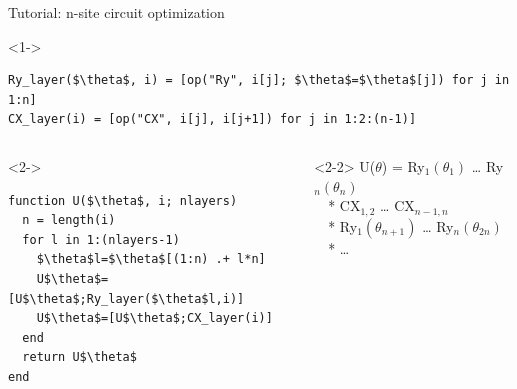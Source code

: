 \begin{frame}[fragile]{Tutorial: n-site circuit optimization}

\begin{onlyenv}<1->
\begin{lstlisting}[language=JuliaLocal, style=julia, mathescape, basicstyle=\scriptsize\ttfamily]
Ry_layer($\theta$, i) = [op("Ry", i[j]; $\theta$=$\theta$[j]) for j in 1:n]
CX_layer(i) = [op("CX", i[j], i[j+1]) for j in 1:2:(n-1)]
\end{lstlisting}
\end{onlyenv}

\begin{columns}

\begin{column}{5cm}

\begin{onlyenv}<2->
\begin{lstlisting}[language=JuliaLocal, style=julia, mathescape, basicstyle=\scriptsize\ttfamily]
function U($\theta$, i; nlayers)
  n = length(i)
  for l in 1:(nlayers-1)
    $\theta$l=$\theta$[(1:n) .+ l*n]
    U$\theta$=[U$\theta$;Ry_layer($\theta$l,i)]
    U$\theta$=[U$\theta$;CX_layer(i)]
  end
  return U$\theta$
end
\end{lstlisting}
\end{onlyenv}

\end{column}

\begin{column}{5.5cm}

\begin{onlyenv}<2-2>
U($\theta$) = Ry$_1(\theta_1)$ … Ry$_n(\theta_n)$ \\
\ \ *           CX$_{1,2}$ … CX$_{n-1,n}$ \\
\ \ *          Ry$_1(\theta_{n+1})$ … Ry$_n(\theta_{2n})$ \\
\ \ *           …
~\\
~\\
~\\
~\\
~\\
~\\
\end{onlyenv}


\end{column}
\end{columns}
\end{frame}
